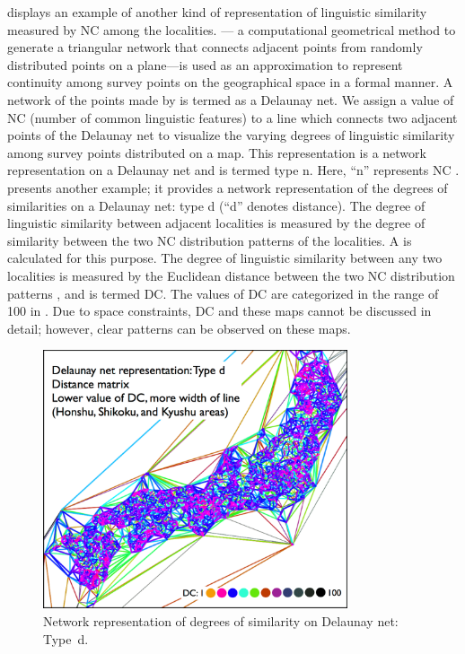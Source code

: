 \documentclass[output=paper]{LSP/langsci}
\begin{document}
 displays an example of another kind of representation of linguistic similarity measured by NC among the localities.  — a computational geometrical method to generate a triangular network that connects adjacent points from randomly distributed points on a plane—is used as an approximation to represent continuity among survey points on the geographical space in a formal manner. A network of the points made by  is termed as a Delaunay net. We assign a value of NC (number of common linguistic features) to a line which connects two adjacent points of the Delaunay net to visualize the varying degrees of linguistic similarity among survey points distributed on a map. This representation is a network representation on a Delaunay net and is termed type n. Here, “n” represents NC \citep[2, 4]{kumagai_development_2013}.  presents another example; it provides a network representation of the degrees of similarities on a Delaunay net: type d (“d” denotes distance). The degree of linguistic similarity between adjacent localities is measured by the degree of similarity between the two NC distribution patterns of the localities. A  is calculated for this purpose. The degree of linguistic similarity between any two localities is measured by the Euclidean distance between the two NC distribution patterns \citep[2, 4]{kumagai_development_2013}, and is termed DC. The values of DC are categorized in the range of 100 in . Due to space constraints, DC and these maps cannot be discussed in detail; however, clear patterns can be observed on these maps.


\begin{figure}[t]
\includegraphics[width=0.8\textwidth]{illustrations/kuma_fig23}
\caption{Network representation of degrees of similarity on Delaunay net: Type~d.}
\label{fig:kuma:23}
\end{figure}          
\end{document}
